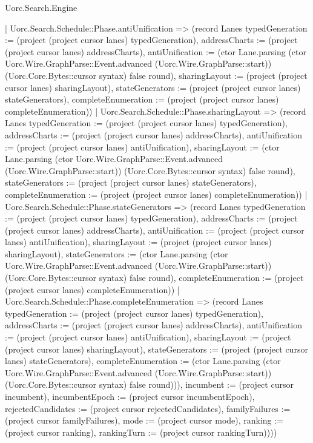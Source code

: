 \begin{lexlean}{Uorc.Search.Engine}
\begin{semanticmodule}
{{      | Uorc.Search.Schedule::Phase.antiUnification => (record Lanes {typedGeneration := (project (project cursor lanes) typedGeneration), addressCharts := (project (project cursor lanes) addressCharts), antiUnification := (ctor Lane.parsing (ctor Uorc.Wire.GraphParse::Event.advanced (Uorc.Wire.GraphParse::start)) (Uorc.Core.Bytes::cursor syntax) false round), sharingLayout := (project (project cursor lanes) sharingLayout), stateGenerators := (project (project cursor lanes) stateGenerators), completeEnumeration := (project (project cursor lanes) completeEnumeration)})
      | Uorc.Search.Schedule::Phase.sharingLayout => (record Lanes {typedGeneration := (project (project cursor lanes) typedGeneration), addressCharts := (project (project cursor lanes) addressCharts), antiUnification := (project (project cursor lanes) antiUnification), sharingLayout := (ctor Lane.parsing (ctor Uorc.Wire.GraphParse::Event.advanced (Uorc.Wire.GraphParse::start)) (Uorc.Core.Bytes::cursor syntax) false round), stateGenerators := (project (project cursor lanes) stateGenerators), completeEnumeration := (project (project cursor lanes) completeEnumeration)})
      | Uorc.Search.Schedule::Phase.stateGenerators => (record Lanes {typedGeneration := (project (project cursor lanes) typedGeneration), addressCharts := (project (project cursor lanes) addressCharts), antiUnification := (project (project cursor lanes) antiUnification), sharingLayout := (project (project cursor lanes) sharingLayout), stateGenerators := (ctor Lane.parsing (ctor Uorc.Wire.GraphParse::Event.advanced (Uorc.Wire.GraphParse::start)) (Uorc.Core.Bytes::cursor syntax) false round), completeEnumeration := (project (project cursor lanes) completeEnumeration)})
      | Uorc.Search.Schedule::Phase.completeEnumeration => (record Lanes {typedGeneration := (project (project cursor lanes) typedGeneration), addressCharts := (project (project cursor lanes) addressCharts), antiUnification := (project (project cursor lanes) antiUnification), sharingLayout := (project (project cursor lanes) sharingLayout), stateGenerators := (project (project cursor lanes) stateGenerators), completeEnumeration := (ctor Lane.parsing (ctor Uorc.Wire.GraphParse::Event.advanced (Uorc.Wire.GraphParse::start)) (Uorc.Core.Bytes::cursor syntax) false round)})), incumbent := (project cursor incumbent), incumbentEpoch := (project cursor incumbentEpoch), rejectedCandidates := (project cursor rejectedCandidates), familyFailures := (project cursor familyFailures), mode := (project cursor mode), ranking := (project cursor ranking), rankingTurn := (project cursor rankingTurn)})))
}


\end{semanticmodule}
\end{lexlean}
